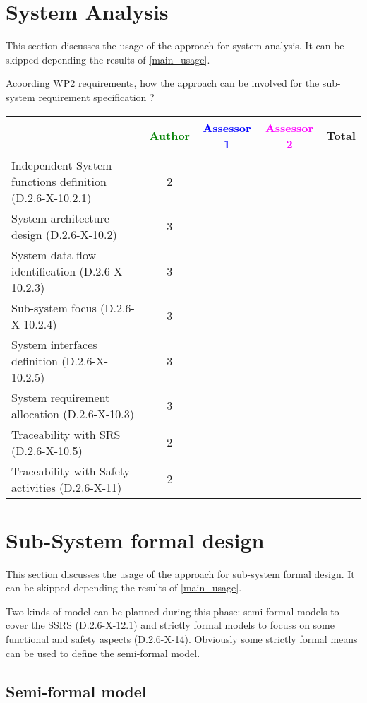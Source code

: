 \section{System Analysis}
This section discusses the usage of the approach for system analysis.
It can be skipped depending the results of \ref{main_usage}.

Acoording WP2 requirements, how the approach can be involved for the sub-system requirement specification ?

\begin{tabular}{|l | c | c | c | c|}
\hline
& \textcolor{green}{Author} & \textcolor{blue}{Assessor 1} & \textcolor{magenta}{Assessor 2} & Total \\
\hline
Independent System functions definition (D.2.6-X-10.2.1)  &2 & & &  \\
\hline 
System architecture design (D.2.6-X-10.2) &3 & & &  \\
\hline
System data flow identification (D.2.6-X-10.2.3)  &3 & & &  \\
\hline
Sub-system focus (D.2.6-X-10.2.4)  &3 & & &  \\
\hline
System interfaces definition (D.2.6-X-10.2.5)  &3 & & &  \\
\hline
System requirement allocation (D.2.6-X-10.3)  &3 & & &  \\
\hline
Traceability with SRS (D.2.6-X-10.5)  &2 & & &  \\
\hline
Traceability with Safety activities (D.2.6-X-11)  &2 & & &  \\
\hline
\end{tabular}



\section{Sub-System formal design}
This section discusses the usage of the approach for sub-system formal design.
It can be skipped depending the results of \ref{main_usage}.

Two kinds of model can be planned during this phase: semi-formal models to  cover the SSRS (D.2.6-X-12.1) and strictly formal  models to  focuss on some functional and safety aspects (D.2.6-X-14).  Obviously some strictly  formal means can be used to define the semi-formal  model.

\subsection{Semi-formal model}


